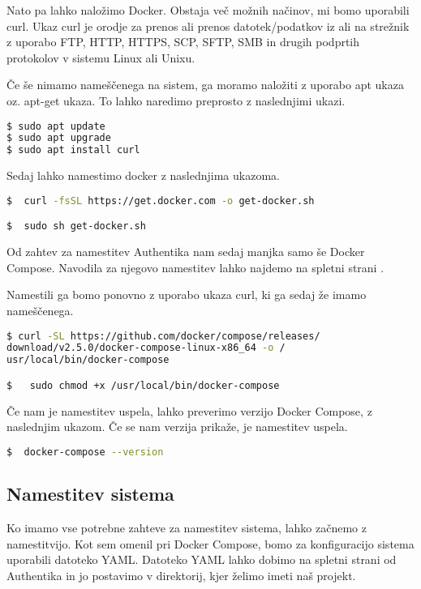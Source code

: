 \documentclass[a4paper,12pt,openright]{book}
\begin{document}
 Nato pa lahko naložimo Docker. Obstaja več možnih načinov, mi bomo uporabili curl.
 \newline
 Ukaz curl je orodje za prenos ali prenos datotek/podatkov iz ali na strežnik z uporabo FTP, HTTP, HTTPS, SCP, SFTP, SMB in drugih podprtih protokolov v sistemu Linux ali Unixu.
 
 Če še nimamo nameščenega na sistem, ga moramo naložiti z uporabo apt ukaza oz. apt-get ukaza. To lahko naredimo preprosto z naslednjimi ukazi.
 
\begin{lstlisting}[language=bash]
$ sudo apt update
$ sudo apt upgrade
$ sudo apt install curl
\end{lstlisting}

Sedaj lahko namestimo docker z naslednjima ukazoma.


\begin{lstlisting}[language=bash]
$  curl -fsSL https://get.docker.com -o get-docker.sh

$  sudo sh get-docker.sh
\end{lstlisting}

Od zahtev za namestitev Authentika nam sedaj manjka samo še Docker Compose. Navodila za njegovo namestitev lahko najdemo na spletni strani \cite{DockerCompose}. 

Namestili ga bomo ponovno z uporabo ukaza curl, ki ga sedaj že imamo nameščenega.


\begin{lstlisting}[language=bash]
$ curl -SL https://github.com/docker/compose/releases/
download/v2.5.0/docker-compose-linux-x86_64 -o /
usr/local/bin/docker-compose

$   sudo chmod +x /usr/local/bin/docker-compose
\end{lstlisting}

Če nam je namestitev uspela, lahko preverimo verzijo Docker Compose, z naslednjim ukazom. Če se nam verzija prikaže, je namestitev uspela.

\begin{lstlisting}[language=bash]
$  docker-compose --version
\end{lstlisting}

\subsection{Namestitev sistema}

Ko imamo vse potrebne zahteve za namestitev sistema, lahko začnemo z namestitvijo. Kot sem omenil pri Docker Compose, bomo za konfiguracijo sistema uporabili datoteko YAML. Datoteko YAML lahko dobimo na spletni strani od Authentika\cite{AuthentikYAML} in jo postavimo v direktorij, kjer želimo imeti naš projekt. 
\end{document}
